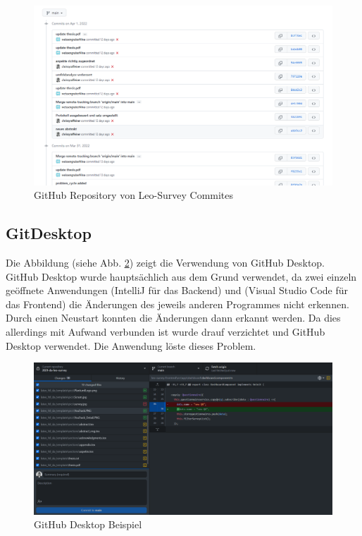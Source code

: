 \begin{figure}[H]
    \includegraphics[width=1.0\textwidth]{pics/ComittHistory.PNG}
    \centering
    \caption{GitHub Repository von Leo-Survey Commites}
    \label{fig:gituse2}
\end{figure}

\subsection{GitDesktop}
Die Abbildung (siehe Abb. \ref{fig:git1}) zeigt die Verwendung von GitHub Desktop.
GitHub Desktop wurde hauptsächlich aus dem Grund verwendet, da zwei einzeln geöffnete Anwendungen (IntelliJ für das Backend) 
und (Visual Studio Code für das Frontend) die Änderungen des jeweils 
anderen Programmes nicht erkennen. Durch einen Neustart konnten die Änderungen dann erkannt werden. 
Da dies allerdings mit Aufwand verbunden ist wurde drauf verzichtet und 
GitHub Desktop verwendet. Die Anwendung löste dieses Problem.
\begin{figure}[H]
    \includegraphics[width=1.0\textwidth]{pics/GitDesktop.PNG}
    \centering
    \caption{GitHub Desktop Beispiel}
    \label{fig:git1}
\end{figure}

